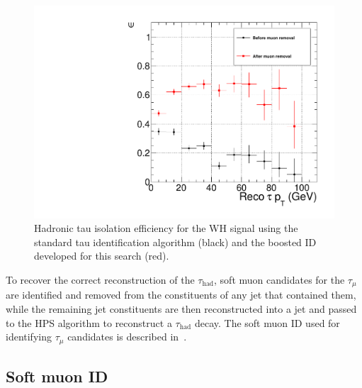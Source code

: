 \begin{figure}[hbtp]
  \begin{center}
    \includegraphics[width=\cmsFigWidth]{figures/effVsPT_MCTruthMuonRemoval_LooseCombinedIsolationDBSumPtCorr_canvas}
    \caption{Hadronic tau isolation efficiency for the WH signal using the standard tau identification algorithm (black) and the boosted ID developed for this search (red).}
    \label{fig:evt-sel-HPS-iso-eff-standard-vs-boosted-ID}
  \end{center}
\end{figure}

To recover the correct reconstruction of the $\tau_{\text{had}}$, soft muon candidates for the $\tau_{\mu}$ are identified and removed from the constituents of any jet that contained them, while the remaining jet constituents are then reconstructed into a jet and passed to the HPS algorithm to reconstruct a $\tau_{\text{had}}$ decay. The soft muon ID used for identifying $\tau_{\mu}$ candidates is described in~\cite{CMS:2010uta}.

\subsection{Soft muon ID\label{sec:evtsel-softmu}}

